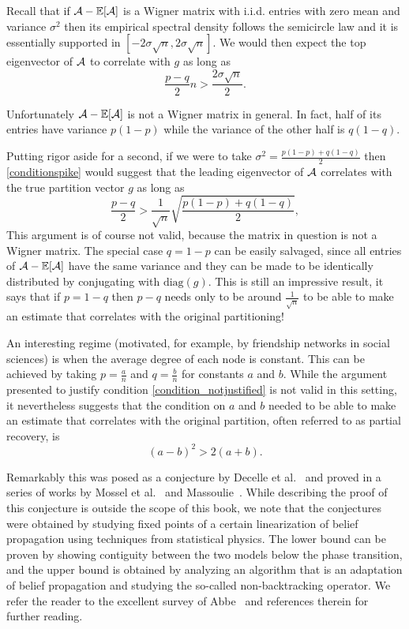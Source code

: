 Recall that if $\mathcal{A}-\mathbb{E}[\mathcal{A}]$ is a Wigner matrix with i.i.d. entries with zero mean and variance $\sigma^2$ then its empirical spectral density follows the semicircle law and it is essentially supported in $[-2\sigma\sqrt{n},2\sigma\sqrt{n}]$. We would then expect the top eigenvector of $\mathcal{A}$ to correlate with $g$ as long as
\begin{equation}\label{conditionspike}
 \frac{p-q}2n  > \frac{2\sigma\sqrt{n}}2.
\end{equation}

Unfortunately $\mathcal{A}-\mathbb{E}[\mathcal{A}]$ is not a Wigner matrix in general. In fact, half of its entries have variance $p(1-p)$ while the variance of the other half is $q(1-q)$.

Putting rigor aside for a second, if we were to take $\sigma^2 = \frac{p(1-p)+q(1-q)}2$ then \eqref{conditionspike} would suggest that the leading eigenvector of $\mathcal{A}$ correlates with the true partition vector $g$ as long as
\begin{equation}\label{condition_notjustified}
 \frac{p-q}2  > \frac1{\sqrt{n}}\sqrt{\frac{p(1-p)+q(1-q)}2},
\end{equation}
This argument is of course not valid, because the matrix in question is not a Wigner matrix. The special case $q = 1-p$ can be easily salvaged, since all entries of $\mathcal{A}-\mathbb{E}[\mathcal{A}]$ have the same variance and they can be made to be identically distributed by conjugating with $\mathrm{diag}(g)$. This is still an impressive result, it says that if $p=1-q$ then $p-q$ needs only to be around $\frac1{\sqrt{n}}$ to be able to make an estimate that correlates with the original partitioning!

An interesting regime (motivated, for example, by friendship networks in social sciences) is when the average degree of each node is constant. This can be achieved by taking $p = \frac{a}n$ and $q = \frac{b}n$ for constants $a$ and $b$. While the argument presented to justify condition \eqref{condition_notjustified} is not valid in this setting, it nevertheless suggests that the condition on $a$ and $b$ needed to be able to make an estimate that correlates with the original partition, often referred to as partial recovery, is
\begin{equation}\label{condition_notjustified_ab}
 (a-b)^2  > 2(a+b).
\end{equation}

Remarkably this was posed as a conjecture by Decelle et al.~\cite{Decelle_SBM} and proved in a series of works by Mossel et al.~\cite{Mossel_SBM1,Mossel_SBM2} and Massoulie~\cite{Massoulie_SBM}. While describing the proof of this conjecture is outside the scope of this book, we note that the conjectures were obtained by studying fixed points of a certain linearization of belief propagation using techniques from statistical physics. The lower bound can be proven by showing contiguity between the two models below the phase transition, and the upper bound is obtained by analyzing an algorithm that is an adaptation of belief propagation and studying the so-called non-backtracking operator. We refer the reader to the excellent survey of Abbe~\cite{Abbe_SBM_survey} and references therein for further reading.

